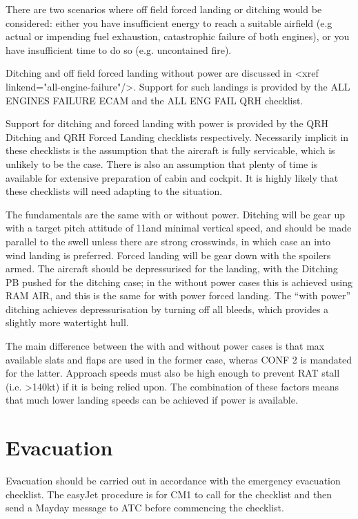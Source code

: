 \documentclass[a5paper,11pt,twoside]{book}
\newcommand{\multicite}[1]{
  \nopagebreak
  \noindent{\footnotesize\color{blue}{[ #1 ]}}
}
\begin{document}
There are two scenarios where off field forced landing or ditching would be
considered: either you have insufficient energy to reach a suitable airfield
(e.g actual or impending fuel exhaustion, catastrophic failure of both engines),
or you have insufficient time to do so (e.g. uncontained fire).

Ditching and off field forced landing without power are discussed in <xref
linkend="all-engine-failure"/>. Support for such landings is provided by the ALL
ENGINES FAILURE ECAM and the ALL ENG FAIL QRH checklist.

Support for ditching and forced landing with power is provided by the QRH
Ditching and QRH Forced Landing checklists respectively. Necessarily implicit in
these checklists is the assumption that the aircraft is fully servicable, which
is unlikely to be the case. There is also an assumption that plenty of time is
available for extensive preparation of cabin and cockpit. It is highly likely
that these checklists will need adapting to the situation.

The fundamentals are the same with or without power. Ditching will be gear up
with a target pitch attitude of 11\textdegree{ }and minimal vertical speed, and should be
made parallel to the swell unless there are strong crosswinds, in which case an
into wind landing is preferred. Forced landing will be gear down with the
spoilers armed. The aircraft should be depressurised for the landing, with the
Ditching PB pushed for the ditching case; in the without power cases this is
achieved using RAM AIR, and this is the same for with power forced landing. The
“with power” ditching achieves depressurisation by turning off all bleeds, which
provides a slightly more watertight hull.

The main difference between the with and without power cases is that max
available slats and flaps are used in the former case, wheras CONF 2 is mandated
for the latter. Approach speeds must also be high enough to prevent RAT stall
(i.e. >140kt) if it is being relied upon. The combination of these factors means
that much lower landing speeds can be achieved if power is available.

\multicite{QRH~AEP.MISC}

\section{Evacuation}

Evacuation should be carried out in accordance with the emergency evacuation
checklist. The easyJet procedure is for CM1 to call for the checklist and then
send a Mayday message to ATC before commencing the checklist.
\end{document}
